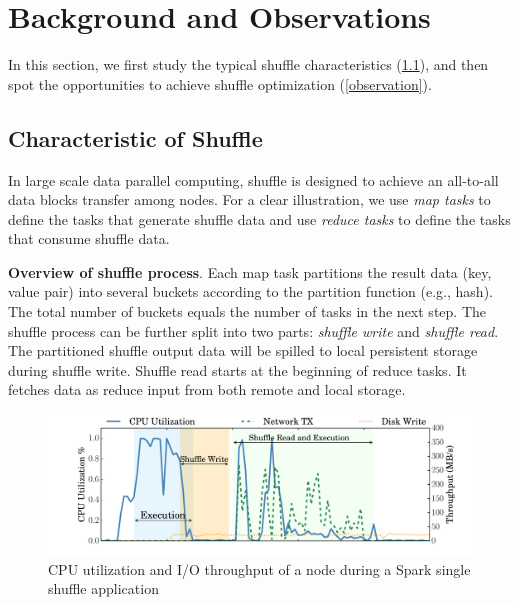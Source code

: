 \section{Background and Observations}

In this section, we first study the typical shuffle characteristics (\ref{shuffle pattern}), and then spot the opportunities to achieve shuffle optimization (\ref{observation}).
\subsection{Characteristic of Shuffle} \label{shuffle pattern}

In large scale data parallel computing, shuffle is designed to achieve an all-to-all data blocks transfer among nodes. For a clear illustration, we use \textit{map tasks} to define the tasks that generate shuffle data and use \textit{reduce tasks} to define the tasks that consume shuffle data.

\textbf{Overview of shuffle process}. Each map task partitions the result data (key, value pair) into several buckets according to the partition function (e.g., hash). The total number of buckets equals the number of tasks in the next step.
The shuffle process can be further split into two parts: \textit{shuffle write} and \textit{shuffle read}. 
The partitioned shuffle output data will be spilled to local persistent storage during shuffle write.
Shuffle read starts at the beginning of reduce tasks. It fetches data as reduce input from both remote and local storage.

\begin{figure}
	\includegraphics[width=\linewidth]{fig/util}
	\caption{CPU utilization and I/O throughput of a node during a Spark single shuffle application}
	\label{fig:util}
\end{figure}

